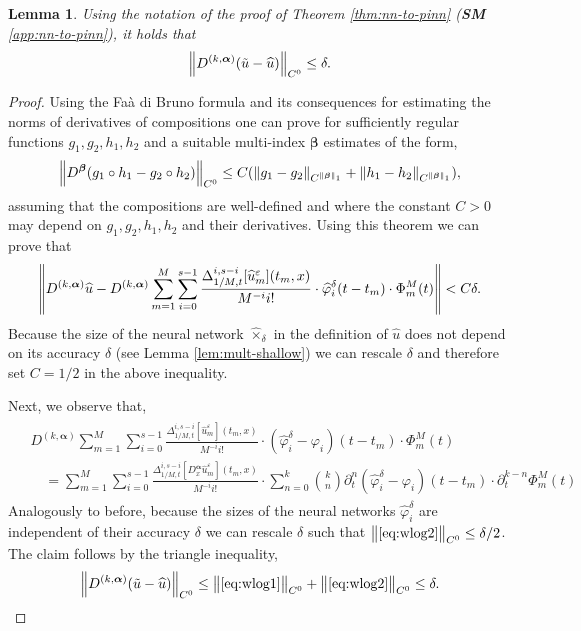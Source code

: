 \documentclass{article}
\numberwithin{equation}{section}
\newcommand{\bmalpha}{{\bm{\alpha}}}
\newcommand{\uhat}{{\widehat{u}}}
\newcommand{\branch}{{\bm{\beta}}}
\renewcommand{\epsilon}{\varepsilon}
\newcommand{\1}{\mathbbm{1}}
\newcommand{\hattimes}{\widehat{\times}}
\newcommand{\utilde}{\Tilde{u}}
\newcommand{\varphihat}{{\widehat{\varphi}}}
\newtheorem{lemma}[theorem]{Lemma}
\begin{document}
\begin{lemma}\label{lem:wlog-faa-di-bruno}
Using the notation of the proof of Theorem \ref{thm:nn-to-pinn} (\textbf{SM} \ref{app:nn-to-pinn}), it holds that 
\begin{equation}
    \norm{D^{(k,\bmalpha)}(\utilde-\uhat)}_{C^0} \leq \delta.
\end{equation}
\end{lemma}
\begin{proof}
Using the Faà di Bruno formula \cite{constantine1996multivariate} and its consequences for estimating the norms of derivatives of compositions \cite[Lemma A.7]{deryck2021approximation} one can prove for sufficiently regular functions $g_1,g_2,h_1,h_2$ and a suitable multi-index $\branch$ estimates of the form,
\begin{equation}
    \norm{D^{\branch}(g_1\circ h_1-g_2\circ h_2)}_{C^0} \leq C(\norm{g_1-g_2}_{C^{\norm{\branch}_1}}+\norm{h_1-h_2}_{C^{\norm{\branch}_1}}), 
\end{equation}
assuming that the compositions are well-defined and where the constant $C>0$ may depend on $g_1,g_2,h_1,h_2$ and their derivatives. Using this theorem we can prove that
\begin{equation}\label{eq:wlog1}
    \norm{D^{(k,\bmalpha)}\uhat-D^{(k,\bmalpha)}\sum_{m=1}^M \sum_{i=0}^{s-1} \frac{\Delta^{i,s-i}_{1/M,t}[\uhat^\epsilon_m](t_m,x)}{M^{-i} i!}\cdot \widehat{\varphi}_i^\delta(t-t_m)\cdot \Phi^M_m(t)} < C\delta. 
\end{equation}
Because the size of the neural network $\hattimes_\delta$ in the definition of $\uhat$ does not depend on its accuracy $\delta$ (see Lemma \ref{lem:mult-shallow}) we can rescale $\delta$ and therefore set $C=1/2$ in the above inequality. 

Next, we observe that,
\begin{align}\label{eq:wlog2}
    \begin{split}
        &D^{(k,\bmalpha)}\sum_{m=1}^M \sum_{i=0}^{s-1} \frac{\Delta^{i,s-i}_{1/M,t}[\uhat^\epsilon_m](t_m,x)}{M^{-i} i!}\cdot (\widehat{\varphi}_i^\delta-\varphi_i)(t-t_m)\cdot \Phi^M_m(t) \\
        &\quad = \sum_{m=1}^M \sum_{i=0}^{s-1} \frac{\Delta^{i,s-i}_{1/M,t}[D^\bmalpha_x \uhat^\epsilon_m](t_m,x)}{M^{-i} i!}\cdot \sum_{n=0}^k \binom{k}{n}\partial_t^n(\widehat{\varphi}_i^\delta-\varphi_i)(t-t_m)\cdot \partial_t^{k-n}\Phi^M_m(t)
    \end{split}
\end{align}
Analogously to before, because the sizes of the neural networks $\varphihat_i^\delta$ are independent of their accuracy $\delta$ we can rescale $\delta$ such that $\norm{\eqref{eq:wlog2}}_{C^0}\leq \delta/2$. The claim follows by the triangle inequality,
\begin{equation}
    \norm{D^{(k,\bmalpha)}(\utilde-\uhat)}_{C^0} \leq\norm{\eqref{eq:wlog1}}_{C^0}+ \norm{\eqref{eq:wlog2}}_{C^0}\leq \delta.
\end{equation}
\end{proof}
\end{document}
